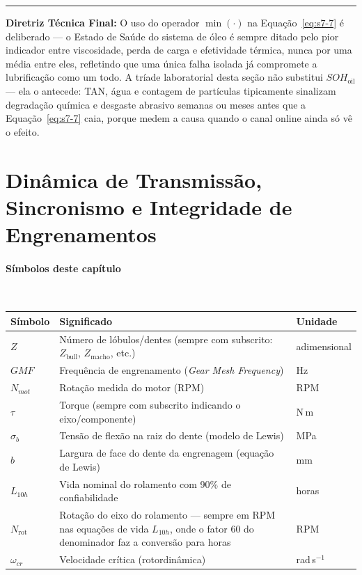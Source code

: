 \documentclass[12pt,a4paper]{article}
\numberwithin{equation}{section}
\numberwithin{table}{section}
\numberwithin{figure}{section}
\begin{document}
{	\vspace{1em}
	\hrule
	\vspace{1em}

	\textbf{Diretriz Técnica Final:} O uso do operador $\min(\cdot)$ na Equação~\eqref{eq:s7-7} é deliberado — o Estado de Saúde do sistema de óleo é sempre ditado pelo pior indicador entre viscosidade, perda de carga e efetividade térmica, nunca por uma média entre eles, refletindo que uma única falha isolada já compromete a lubrificação como um todo. A tríade laboratorial desta seção não substitui $SOH_{\text{oil}}$ — ela o antecede: TAN, água e contagem de partículas tipicamente sinalizam degradação química e desgaste abrasivo semanas ou meses antes que a Equação~\eqref{eq:s7-7} caia, porque medem a causa quando o canal online ainda só vê o efeito.

	
	
	\clearpage
	\section{\textbf{Dinâmica de Transmissão, Sincronismo e Integridade de Engrenamentos}}

\paragraph{Símbolos deste capítulo}\mbox{}\\[-0.5em]
{\small
\begin{longtable}{>{\raggedright\arraybackslash}p{2.6cm} >{\raggedright\arraybackslash}p{9.2cm} >{\raggedright\arraybackslash}p{2.6cm}}
	\toprule
	\textbf{Símbolo} & \textbf{Significado} & \textbf{Unidade} \\ \midrule
	\endhead
	$Z$ & Número de lóbulos/dentes (sempre com subscrito: $Z_{\text{bull}}$, $Z_{\text{macho}}$, etc.) & adimensional \\
	$GMF$ & Frequência de engrenamento (\textit{Gear Mesh Frequency}) & Hz \\
	$N_{mot}$\dag & Rotação medida do motor (RPM) & RPM \\
	$\tau$ & Torque (sempre com subscrito indicando o eixo/componente) & N\,m \\
	$\sigma_b$ & Tensão de flexão na raiz do dente (modelo de Lewis) & MPa \\
	$b$ & Largura de face do dente da engrenagem (equação de Lewis) & mm \\
	$L_{10h}$ & Vida nominal do rolamento com 90\% de confiabilidade & horas \\
	$N_{\text{rot}}$\dag & Rotação do eixo do rolamento — sempre em RPM nas equações de vida $L_{10h}$, onde o fator 60 do denominador faz a conversão para horas & RPM \\
	$\omega_{cr}$ & Velocidade crítica (rotordinâmica) & rad\,s$^{-1}$ \\
	\bottomrule
\end{longtable}
}




}
\end{document}
